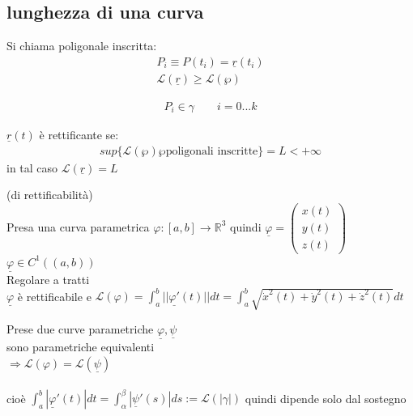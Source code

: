 \documentclass[a4paper, oneside]{article}
\newcommand{\tab}{\hspace*{2em}}
\begin{document}
\subsection{lunghezza di una curva}
\begin{center}
\end{center}
Si chiama poligonale inscritta:
\begin{gather*}
    P_i \equiv P(t_i) = \underline{r}(t_i)\\
    \mathcal{L}(\underline{r}) \geq \mathcal{L}(\wp)
\end{gather*}
\begin{observation}
    \begin{gather*}
        P_i \in \gamma \qquad i = 0...k
    \end{gather*}
\end{observation}
\begin{definition}
    $\underline{r}(t)$ è rettificante se:
    \begin{gather*}
        sup\{\mathcal{L}(\wp) \wp \text{poligonali inscritte}\} = L < +\infty
    \end{gather*}
    in tal caso $\mathcal{L}(\underline{r}) = L$

\end{definition}

\begin{theorem}
    (di rettificabilità) \\
    Presa una curva parametrica $\varphi: [a,b] \to \mathbb{R}^3$ quindi $\underline{\varphi} = \begin{pmatrix}
        x(t)\\ y(t)\\ z(t)
    \end{pmatrix}$\\
     $\underline{\varphi} \in C^1((a,b))$\\
     Regolare a tratti\\
    \tab {} $ \underline{\varphi}$ è rettificabile e $\mathcal{L}(\varphi) = \int_{a}^{b} ||\underline{\varphi' }(t)|| dt = \int_{a}^{b} \sqrt{\dot{x}^2(t)+\dot{y}^2(t)+\dot{z}^2(t)} dt$
\end{theorem}
\begin{proposition}
    Prese due curve parametriche $\underline{\varphi}, \underline{\psi}$\\ 
     sono parametriche equivalenti \\
    \tab$\Rightarrow \mathcal{L}(\varphi) = \mathcal{L}(\underline{\psi})$\\\\
    cioè $ \int_{a}^{b} | \underline{\varphi}'(t) | dt = \int_{\alpha}^{\beta} | \underline{\psi}' (s) | ds := \mathcal{L}(| \gamma |)$ quindi dipende solo dal sostegno
\end{proposition}
\end{document}
